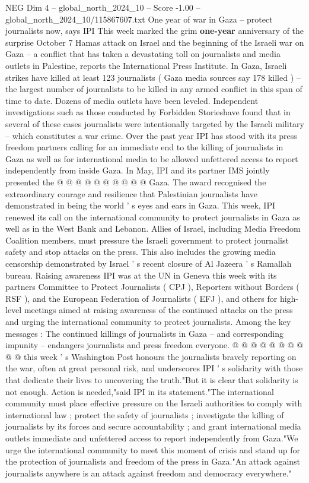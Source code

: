 \begin{textsample}{NEG Dim 4 – global\_north\_2024\_10 – Score -1.00 – global\_north\_2024\_10/115867607.txt}  \label{ex:f4_neg_054}
One year of war in Gaza -- protect journalists now, says IPI This week marked the grim \textbf{one-year} anniversary of the surprise October 7 Hamas attack on Israel and the beginning of the Israeli war on Gaza -- a conflict that has taken a devastating toll on journalists and media outlets in Palestine, reports the International Press Institute.
In Gaza, Israeli strikes have killed at least 123 journalists ( Gaza media sources say 178 killed ) -- the largest number of journalists to be killed in any armed conflict in this span of time to date.
Dozens of media outlets have been leveled.
Independent investigations such as those conducted by Forbidden Storieshave found that in several of these cases journalists were intentionally targeted by the Israeli military -- which constitutes a war crime.
Over the past year IPI has stood with its press freedom partners calling for an immediate end to the killing of journalists in Gaza as well as for international media to be allowed unfettered access to report independently from inside Gaza.
In May, IPI and its partner IMS jointly presented the @ @ @ @ @ @ @ @ @ @ Gaza.
The award recognised the extraordinary courage and resilience that Palestinian journalists have demonstrated in being the world ' s eyes and ears in Gaza.
This week, IPI renewed its call on the international community to protect journalists in Gaza as well as in the West Bank and Lebanon.
Allies of Israel, including Media Freedom Coalition members, must pressure the Israeli government to protect journalist safety and stop attacks on the press.
This also includes the growing media censorship demonstrated by Israel ' s recent closure of Al Jazeera ' s Ramallah bureau.
Raising awareness IPI was at the UN in Geneva this week with its partners Committee to Protect Journalists ( CPJ ), Reporters without Borders ( RSF ), and the European Federation of Journalists ( EFJ ), and others for high-level meetings aimed at raising awareness of the continued attacks on the press and urging the international community to protect journalists.
Among the key messages : The continued killings of journalists in Gaza -- and corresponding impunity -- endangers journalists and press freedom everyone. @ @ @ @ @ @ @ @ @ @ this week ' s Washington Post honours the journalists bravely reporting on the war, often at great personal risk, and underscores IPI ' s solidarity with those that dedicate their lives to uncovering the truth."But it is clear that solidarity is not enough.
Action is needed,"said IPI in its statement."The international community must place effective pressure on the Israeli authorities to comply with international law ; protect the safety of journalists ; investigate the killing of journalists by its forces and secure accountability ; and grant international media outlets immediate and unfettered access to report independently from Gaza."We urge the international community to meet this moment of crisis and stand up for the protection of journalists and freedom of the press in Gaza."An attack against journalists anywhere is an attack against freedom and democracy everywhere."

\end{textsample}
